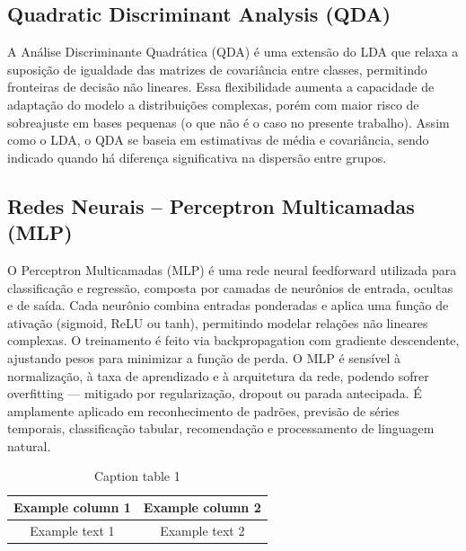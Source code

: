 \documentclass[english, spanish, brazilian]{RBIEarticle} %
\begin{document}
\subsection{Quadratic Discriminant Analysis (QDA)}
A Análise Discriminante Quadrática (QDA) é uma extensão do LDA que relaxa a suposição de igualdade das matrizes de covariância entre classes, permitindo fronteiras de decisão não lineares. Essa flexibilidade aumenta a capacidade de adaptação do modelo a distribuições complexas, porém com maior risco de sobreajuste em bases pequenas (o que não é o caso no presente trabalho). Assim como o LDA, o QDA se baseia em estimativas de média e covariância, sendo indicado quando há diferença significativa na dispersão entre grupos.

\subsection{Redes Neurais – Perceptron Multicamadas (MLP)}
O Perceptron Multicamadas (MLP) é uma rede neural feedforward utilizada para classificação e regressão, composta por camadas de neurônios de entrada, ocultas e de saída. Cada neurônio combina entradas ponderadas e aplica uma função de ativação (sigmoid, ReLU ou tanh), permitindo modelar relações não lineares complexas. O treinamento é feito via backpropagation com gradiente descendente, ajustando pesos para minimizar a função de perda. O MLP é sensível à normalização, à taxa de aprendizado e à arquitetura da rede, podendo sofrer overfitting — mitigado por regularização, dropout ou parada antecipada. É amplamente aplicado em reconhecimento de padrões, previsão de séries temporais, classificação tabular, recomendação e processamento de linguagem natural.




\iffalse %
    \begin{table}[h]
    	\caption{Caption table 1}
    	\label{tab:one}
    	\centering\footnotesize%
    	\begin{tabular}{|c|c|}
    		\hline
    		\rowcolor{gray} \textbf{Example column 1} & \textbf{Example column 2}\\
    		\hline
    		Example text 1 & Example text 2\\
    		\hline
    	\end{tabular}
    \end{table}
\end{document}
